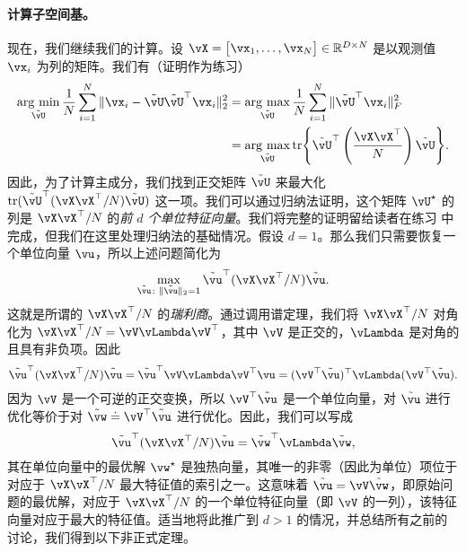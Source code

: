 \documentclass[../../book-main_zh.tex]{subfiles}
\begin{document}
\paragraph{计算子空间基。}
现在，我们继续我们的计算。设 \(\vX = \mat{\vx_{1}, \dots, \vx_{N}} \in \R^{D \times N}\) 是以观测值 \(\vx_{i}\) 为列的矩阵。我们有（证明作为练习）
\begin{align}
    \argmin_{\tilde{\vU}}\frac{1}{N}\sum_{i = 1}^{N}\norm{\vx_{i} - \tilde{\vU}\tilde{\vU}^{\top}\vx_{i}}_{2}^{2}
    &= \argmax_{\tilde{\vU}}\frac{1}{N}\sum_{i = 1}^{N}\norm{\tilde{\vU}^{\top}\vx_{i}}_{F}^{2} \\ 
    &= \argmax_{\tilde{\vU}}\tr\rc{\tilde{\vU}^{\top}\bp{\frac{\vX\vX^{\top}}{N}}\tilde{\vU}}.
\end{align}
因此，为了计算主成分，我们找到正交矩阵 \(\tilde{\vU}\) 来最大化 \(\tr(\tilde{\vU}^{\top}(\vX\vX^{\top}/N)\tilde{\vU})\) 这一项。我们可以通过归纳法证明，这个矩阵 \(\vU^{\star}\) 的列是 \(\vX\vX^{\top}/N\) 的\textit{前 \(d\) 个单位特征向量}。我们将完整的证明留给读者在练习  中完成，但我们在这里处理归纳法的基础情况。假设 \(d = 1\)。那么我们只需要恢复一个单位向量 \(\vu\)，所以上述问题简化为
\begin{equation}
    \max_{\tilde{\vu} \colon \norm{\tilde{\vu}}_{2} = 1} \tilde{\vu}^{\top}(\vX\vX^{\top}/N)\tilde{\vu}.
\end{equation}
这就是所谓的 \(\vX\vX^{\top}/N\) 的\textit{瑞利商}。通过调用谱定理，我们将 \(\vX\vX^{\top}/N\) 对角化为 \(\vX\vX^{\top}/N = \vV\vLambda\vV^{\top}\)，其中 \(\vV\) 是正交的，\(\vLambda\) 是对角的且具有非负项。因此
\begin{equation}
    \tilde{\vu}^{\top}(\vX\vX^{\top}/N)\tilde{\vu} = \tilde{\vu}^{\top}\vV\vLambda\vV^{\top}\vu = (\vV^{\top}\tilde{\vu})^{\top}\vLambda(\vV^{\top}\tilde{\vu}).
\end{equation}
因为 \(\vV\) 是一个可逆的正交变换，所以 \(\vV^{\top}\tilde{\vu}\) 是一个单位向量，对 \(\tilde{\vu}\) 进行优化等价于对 \(\tilde{\vw} \doteq \vV^{\top}\tilde{\vu}\) 进行优化。因此，我们可以写成
\begin{equation}
    \tilde{\vu}^{\top}(\vX\vX^{\top}/N)\tilde{\vu} = \tilde{\vw}^{\top}\vLambda\tilde{\vw},
\end{equation}
其在单位向量中的最优解 \(\vw^{\star}\) 是独热向量，其唯一的非零（因此为单位）项位于对应于 \(\vX\vX^{\top}/N\) 最大特征值的索引之一。这意味着 \(\tilde{\vu} = \vV\tilde{\vw}\)，即原始问题的最优解，对应于 \(\vX\vX^{\top}/N\) 的一个单位特征向量（即 \(\vV\) 的一列），该特征向量对应于最大的特征值。适当地将此推广到 \(d > 1\) 的情况，并总结所有之前的讨论，我们得到以下非正式定理。
\end{document}
